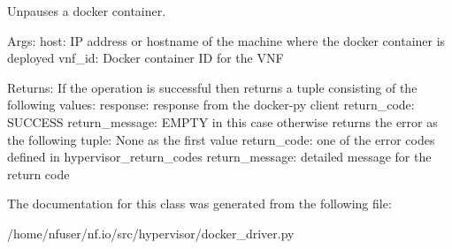 Unpauses a docker container. 

Args\-: host\-: I\-P address or hostname of the machine where the docker container is deployed vnf\-\_\-id\-: Docker container I\-D for the V\-N\-F

Returns\-: If the operation is successful then returns a tuple consisting of the following values\-: response\-: response from the docker-\/py client return\-\_\-code\-: S\-U\-C\-C\-E\-S\-S return\-\_\-message\-: E\-M\-P\-T\-Y in this case otherwise returns the error as the following tuple\-: None as the first value return\-\_\-code\-: one of the error codes defined in hypervisor\-\_\-return\-\_\-codes return\-\_\-message\-: detailed message for the return code 

The documentation for this class was generated from the following file\-:\begin{DoxyCompactItemize}
\item 
/home/nfuser/nf.\-io/src/hypervisor/docker\-\_\-driver.\-py\end{DoxyCompactItemize}
